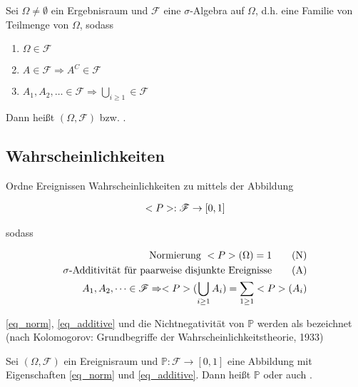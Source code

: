 \begin{definition}
	Sei $\Omega \neq \emptyset$ ein Ergebnisraum und $\mathscr{F}$ eine $\sigma$-Algebra auf $\Omega$, d.h. eine Familie von Teilmenge von $\Omega$, sodass
	\begin{enumerate}
		\item $\Omega \in \mathscr{F}$
		\item $A \in \mathscr{F} \Rightarrow A^C \in \mathscr{F}$
		\item $A_1, A_2, \dots \in \mathscr{F} \Rightarrow \bigcup_{i \ge 1} \in \mathscr{F}$
	\end{enumerate}
	Dann heißt $(\Omega, \mathscr{F})$  bzw. .
\end{definition}

\subsection*{Wahrscheinlichkeiten}

Ordne Ereignissen Wahrscheinlichkeiten zu mittels der Abbildung

\begin{align}
	\mathbb{P}: \mathscr{F} \to [0,1]\notag
\end{align}

sodass

\begin{align}
	\text{Normierung } \mathbb{P}(\Omega) = 1 \tag{N}\label{eq_norm}\\
	\sigma\text{-Additivität für paarweise disjunkte Ereignisse} \tag{A}\label{eq_additive}\\
	A_1, A_2, \dots \in \mathscr{F} \Rightarrow \mathbb{P}(\bigcup_{i \ge 1} A_i) = \sum_{1 \ge 1} \mathbb{P}(A_i)\notag
\end{align}

\cref{eq_norm}, \cref{eq_additive} und die Nichtnegativität von $\mathbb{P}$ werden als  bezeichnet (nach Kolomogorov: Grundbegriffe der Wahrscheinlichkeitstheorie, 1933)

\begin{definition}
	Sei $(\Omega, \mathscr{F})$ ein Ereignisraum und $\mathbb{P}: \mathscr{F} \to [0,1]$ eine Abbildung mit Eigenschaften \cref{eq_norm} und \cref{eq_additive}. Dann heißt $\mathbb{P}$  oder auch .
\end{definition}

